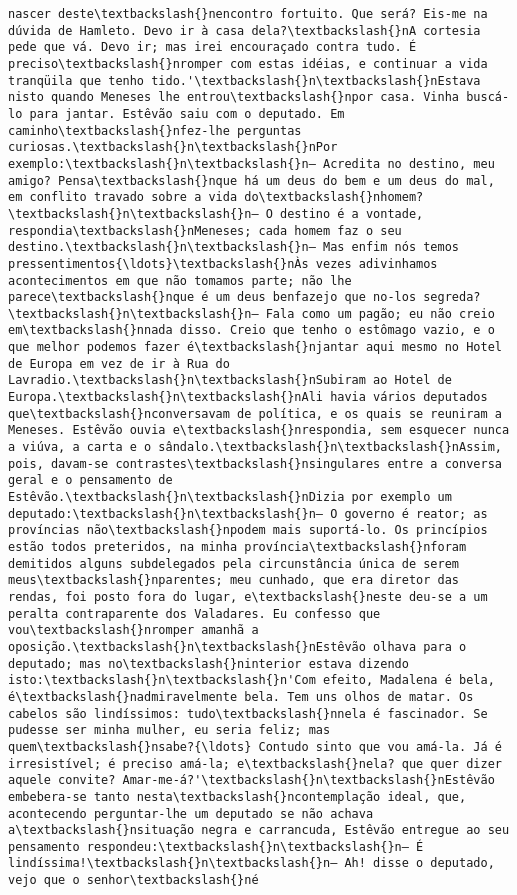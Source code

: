 \begin{Verbatim}[commandchars=\\\{\}]
nascer deste\textbackslash{}nencontro fortuito. Que será? Eis-me na dúvida de Hamleto. Devo ir à casa dela?\textbackslash{}nA cortesia pede que vá. Devo ir; mas irei encouraçado contra tudo. É preciso\textbackslash{}nromper com estas idéias, e continuar a vida tranqüila que tenho tido.'\textbackslash{}n\textbackslash{}nEstava nisto quando Meneses lhe entrou\textbackslash{}npor casa. Vinha buscá-lo para jantar. Estêvão saiu com o deputado. Em caminho\textbackslash{}nfez-lhe perguntas curiosas.\textbackslash{}n\textbackslash{}nPor exemplo:\textbackslash{}n\textbackslash{}n— Acredita no destino, meu amigo? Pensa\textbackslash{}nque há um deus do bem e um deus do mal, em conflito travado sobre a vida do\textbackslash{}nhomem?\textbackslash{}n\textbackslash{}n— O destino é a vontade, respondia\textbackslash{}nMeneses; cada homem faz o seu destino.\textbackslash{}n\textbackslash{}n— Mas enfim nós temos pressentimentos{\ldots}\textbackslash{}nÀs vezes adivinhamos acontecimentos em que não tomamos parte; não lhe parece\textbackslash{}nque é um deus benfazejo que no-los segreda?\textbackslash{}n\textbackslash{}n— Fala como um pagão; eu não creio em\textbackslash{}nnada disso. Creio que tenho o estômago vazio, e o que melhor podemos fazer é\textbackslash{}njantar aqui mesmo no Hotel de Europa em vez de ir à Rua do Lavradio.\textbackslash{}n\textbackslash{}nSubiram ao Hotel de Europa.\textbackslash{}n\textbackslash{}nAli havia vários deputados que\textbackslash{}nconversavam de política, e os quais se reuniram a Meneses. Estêvão ouvia e\textbackslash{}nrespondia, sem esquecer nunca a viúva, a carta e o sândalo.\textbackslash{}n\textbackslash{}nAssim, pois, davam-se contrastes\textbackslash{}nsingulares entre a conversa geral e o pensamento de Estêvão.\textbackslash{}n\textbackslash{}nDizia por exemplo um deputado:\textbackslash{}n\textbackslash{}n— O governo é reator; as províncias não\textbackslash{}npodem mais suportá-lo. Os princípios estão todos preteridos, na minha província\textbackslash{}nforam demitidos alguns subdelegados pela circunstância única de serem meus\textbackslash{}nparentes; meu cunhado, que era diretor das rendas, foi posto fora do lugar, e\textbackslash{}neste deu-se a um peralta contraparente dos Valadares. Eu confesso que vou\textbackslash{}nromper amanhã a oposição.\textbackslash{}n\textbackslash{}nEstêvão olhava para o deputado; mas no\textbackslash{}ninterior estava dizendo isto:\textbackslash{}n\textbackslash{}n'Com efeito, Madalena é bela, é\textbackslash{}nadmiravelmente bela. Tem uns olhos de matar. Os cabelos são lindíssimos: tudo\textbackslash{}nnela é fascinador. Se pudesse ser minha mulher, eu seria feliz; mas quem\textbackslash{}nsabe?{\ldots} Contudo sinto que vou amá-la. Já é irresistível; é preciso amá-la; e\textbackslash{}nela? que quer dizer aquele convite? Amar-me-á?'\textbackslash{}n\textbackslash{}nEstêvão embebera-se tanto nesta\textbackslash{}ncontemplação ideal, que, acontecendo perguntar-lhe um deputado se não achava a\textbackslash{}nsituação negra e carrancuda, Estêvão entregue ao seu pensamento respondeu:\textbackslash{}n\textbackslash{}n— É lindíssima!\textbackslash{}n\textbackslash{}n— Ah! disse o deputado, vejo que o senhor\textbackslash{}né 
\end{Verbatim}
